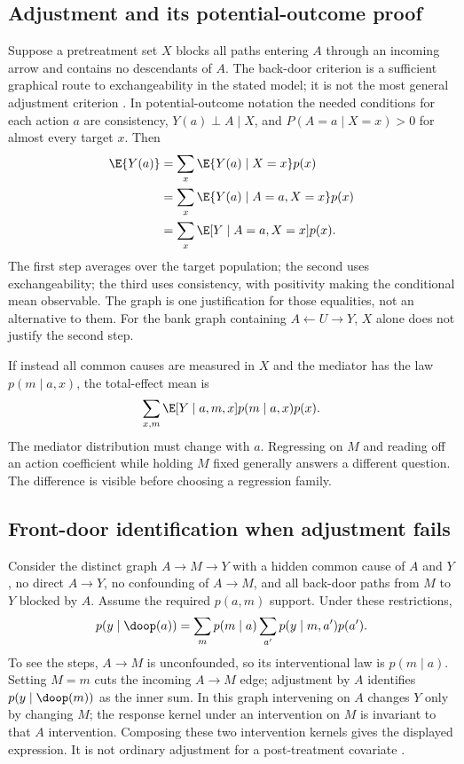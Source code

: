 \subsection{Adjustment and its potential-outcome proof}
Suppose a pretreatment set $X$ blocks all paths entering $A$ through an
incoming arrow and contains no descendants of $A$. The back-door criterion
is a sufficient graphical route to exchangeability in the stated model;
it is not the most general adjustment criterion
\citep[Definition 3]{pearl2009}. In potential-outcome notation the needed
conditions for each action $a$ are consistency, $Y(a)\perp A\mid X$, and
$P(A=a\mid X=x)>0$ for almost every target $x$. Then
\begin{align}
 \E\{Y(a)\}
 &=\sum_x\E\{Y(a)\mid X=x\}p(x)\nonumber\\
 &=\sum_x\E\{Y(a)\mid A=a,X=x\}p(x)\nonumber\\
 &=\sum_x\E[Y\mid A=a,X=x]p(x).
 \label{r3:adjustment}
\end{align}
The first step averages over the target population; the second uses
exchangeability; the third uses consistency, with positivity making the
conditional mean observable. The graph is one justification for those
equalities, not an alternative to them. For the bank graph containing
$A\leftarrow U\to Y$, $X$ alone does not justify the second step.

If instead all common causes are measured in $X$ and the mediator has the
law $p(m\mid a,x)$, the total-effect mean is
\[
 \sum_{x,m}\E[Y\mid a,m,x]p(m\mid a,x)p(x).
\]
The mediator distribution must change with $a$. Regressing on $M$ and
reading off an action coefficient while holding $M$ fixed generally
answers a different question. The difference is visible before choosing
a regression family.

\subsection{Front-door identification when adjustment fails}
Consider the distinct graph $A\to M\to Y$ with a hidden common cause of
$A$ and $Y$, no direct $A\to Y$, no confounding of $A\to M$, and all
back-door paths from $M$ to $Y$ blocked by $A$. Assume the required
$p(a,m)$ support. Under these restrictions,
\begin{equation}
 p(y\mid\doop(a))
 =\sum_m p(m\mid a)\sum_{a'}p(y\mid m,a')p(a').
 \label{r3:frontdoor}
\end{equation}
To see the steps, $A\to M$ is unconfounded, so its interventional law is
$p(m\mid a)$. Setting $M=m$ cuts the incoming $A\to M$ edge; adjustment
by $A$ identifies $p(y\mid\doop(m))$ as the inner sum. In this graph
intervening on $A$ changes $Y$ only by changing $M$; the response kernel
under an intervention on $M$ is invariant to that $A$ intervention.
Composing these two intervention kernels gives the displayed expression.
It is not ordinary adjustment for a post-treatment covariate
\citep[Section 6.7, Example 6.46]{peters2017}.


